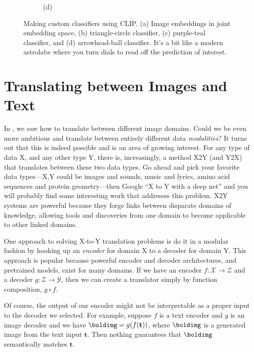 \begin{figure}[h]
{\begin{subfigure}{0.25\textwidth}
            \caption*{(d)}
        \end{subfigure}%
    }
    \caption{Making custom classifiers using CLIP. (a) Image embeddings in joint embedding space, (b) triangle-circle classifier, (c) purple-teal classifier, and (d) arrowhead-ball classifier. It's a bit like a modern astrolabe where you turn dials to read off the prediction of interest.}
    \label{fig:vision_and_language:clip_clocks}
\end{figure}

\section{Translating between Images and Text}

In \chap{\ref{chapter:conditional_generative_models}}, we saw how to translate between different image domains. Could we be even more ambitious and translate between entirely different data \textit{modalities}? It turns out that this is indeed possible and is an area of growing interest. For any type of data X, and any other type Y, there is, increasingly, a method X2Y (and Y2X) that translates between these two data types. Go ahead and pick your favorite data types—X,Y could be images and sounds, music and lyrics, amino acid sequences and protein geometry—then Google ``X to Y with a deep net'' and you will probably find some interesting work that addresses this problem. X2Y systems are powerful because they forge links between disparate domains of knowledge, allowing tools and discoveries from one domain to become applicable to other linked domains.

One approach to solving X-to-Y translation problems is do it in a modular fashion by hooking up an \textit{encoder} for domain X to a decoder for domain Y. This approach is popular because powerful encoder and decoder architectures, and pretrained models, exist for many domains. If we have an encoder $f: \mathcal{X} \rightarrow \mathcal{Z}$ and a decoder $g: \mathcal{Z} \rightarrow \mathcal{Y}$, then we can create a translator simply by function composition, $g \circ f$.

Of course, the output of our encoder might not be interpretable as a proper input to the decoder we selected. For example, suppose $f$ is a text encoder and $g$ is an image decoder and we have $\boldimg = g(f(\mathbf{t}))$, where $\boldimg$ is a generated image from the text input $\mathbf{t}$. Then nothing guarantees that $\boldimg$ semantically matches $\mathbf{t}$.

